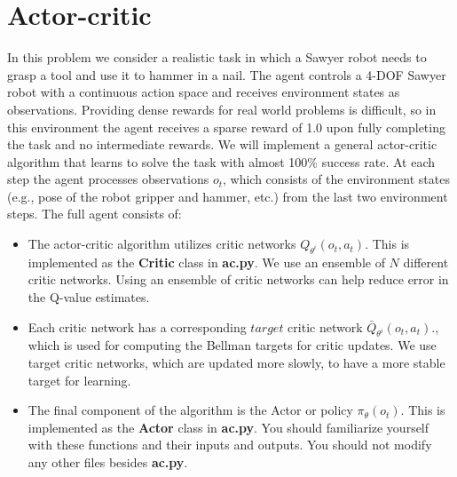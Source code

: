 \section{Actor-critic}


In this problem we consider a realistic task in which a Sawyer robot needs to grasp a tool and use it to hammer in a nail. 
The agent controls a 4-DOF Sawyer robot with a continuous action space and receives environment states as observations.  
Providing dense rewards for real world problems is difficult, so in this environment the agent receives a sparse reward of 1.0 upon fully completing the task and no intermediate rewards. 
We will implement a general actor-critic algorithm that learns to solve the task with almost 100\% success rate. 
At each step the agent processes observations $o_t$, which consists of the environment states (e.g., pose of the robot gripper and hammer, etc.) from the last two environment steps. 
The full agent consists of:

\begin{itemize}
  \item The actor-critic algorithm utilizes critic networks $Q_{\theta^i}(o_t, a_t)$. This is implemented as the \textbf{Critic} class in \textbf{ac.py}. We use an ensemble 
  of $N$ different critic networks. Using an ensemble of critic networks can help reduce error in the Q-value estimates.
  \item Each critic network has a corresponding $target$ critic network $\bar{Q}_{\theta^i}(o_t, a_t)$., which is used for computing the Bellman targets for critic updates. 
  We use target critic networks, which are updated more slowly, to have a more stable target for learning.
  \item The final component of the algorithm is the Actor or policy $\pi_{\theta}(o_{t})$. This is implemented as the \textbf{Actor} class in \textbf{ac.py}. 
  You should familiarize yourself with these functions and their inputs and outputs. You should not modify any other files besides \textbf{ac.py}.
\end{itemize}


\begin{enumerate}[(a)]

  

  

  

\end{enumerate}



